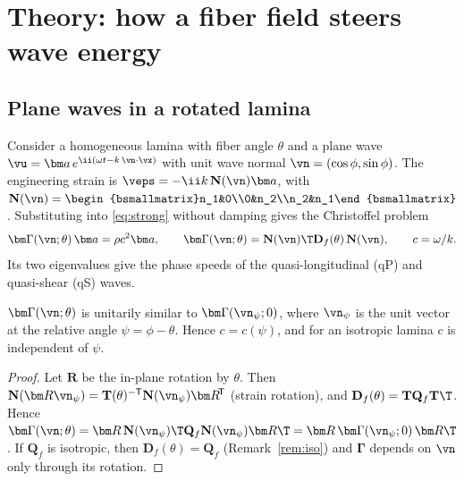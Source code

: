 \section{Theory: how a fiber field steers wave energy}\label{sec:theory}

\subsection{Plane waves in a rotated lamina}
Consider a homogeneous lamina with fiber angle $\theta$ and a plane wave
$\vu=\bm a\,e^{\ii(\omega t-k\,\vn\cdot\vx)}$ with unit wave normal
$\vn=(\cos\phi,\sin\phi)$. The engineering strain is $\veps=-\ii k\,\mathbf N(\vn)\bm a$,
with $\mathbf N(\vn)=\begin{bsmallmatrix}n_1&0\\0&n_2\\n_2&n_1\end{bsmallmatrix}$.
Substituting into \eqref{eq:strong} without damping gives the Christoffel problem
\begin{equation}
\bm\Gamma(\vn;\theta)\,\bm a=\rho c^2\bm a,\qquad
\bm\Gamma(\vn;\theta)=\mathbf N(\vn)\T\mathbf D_f(\theta)\,\mathbf N(\vn),\qquad c=\omega/k .
\label{eq:christoffel}
\end{equation}
Its two eigenvalues give the phase speeds of the quasi-longitudinal (qP) and
quasi-shear (qS) waves.

\begin{proposition}\label{prop:relangle}
$\bm\Gamma(\vn;\theta)$ is unitarily similar to $\bm\Gamma(\vn_\psi;0)$, where $\vn_\psi$ is
the unit vector at the relative angle $\psi=\phi-\theta$. Hence $c=c(\psi)$, and for
an isotropic lamina $c$ is independent of $\psi$.
\end{proposition}
\begin{proof}
Let $\bm R$ be the in-plane rotation by $\theta$. Then
$\mathbf N(\bm R\vn_\psi)=\mathbf T(\theta)^{-\mathsf T}\mathbf N(\vn_\psi)\bm R^{\!\mathsf T}$
(strain rotation), and $\mathbf D_f(\theta)=\mathbf T\mathbf Q_f\mathbf T\T$. Hence
$\bm\Gamma(\vn;\theta)=\bm R\,\mathbf N(\vn_\psi)\T\mathbf Q_f\mathbf N(\vn_\psi)\bm
R\T=\bm R\,\bm\Gamma(\vn_\psi;0)\,\bm R\T$. If $\mathbf Q_f$ is isotropic, then
$\mathbf D_f(\theta)=\mathbf Q_f$ (Remark~\ref{rem:iso}) and $\bm\Gamma$ depends on $\vn$
only through its rotation.
\end{proof}

